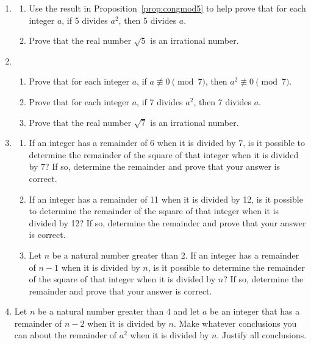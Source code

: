 \begin{enumerate}
\item 
\label{exer:sqrt5-irrational}%
\begin{enumerate}
\item Use the result in Proposition~\ref{prop:congmod5} to help prove that for each integer $a$, if 5 divides $a^2$, then 5 divides $a$.

\item Prove that the real number $\sqrt{5}$ is an irrational number.
\end{enumerate}


\item \begin{enumerate}
\item Prove that for each integer $a$, if $a \not \equiv 0 \pmod 7$, then 
$a^2 \not \equiv 0 \pmod 7$.

\item Prove that for each integer $a$, if 7 divides $a^2$, then 7 divides $a$.

\item Prove that the real number $\sqrt{7}$ is an irrational number.
\end{enumerate}

\item \label{exer:remainderbycong} \begin{enumerate}
\item If an integer has a remainder of 6 when it is divided by 7, is it possible to determine the remainder of the square of that integer when it is divided by 7?  If so, determine the remainder and prove that your answer is correct.

\item If an integer has a remainder of 11 when it is divided by 12, is it possible to determine the remainder of the square of that integer when it is divided by 12?  If so, determine the remainder and prove that your answer is correct.

\item Let $n$ be a natural number greater than 2.  If an integer has a remainder of $n - 1$ when it is divided by $n$, is it possible to determine the remainder of the square of that integer when it is divided by $n$?  If so, determine the remainder and prove that your answer is correct.
\end{enumerate}


\item Let $n$ be a natural number greater than 4 and let $a$ be an integer that has a remainder of $n - 2$ when it is divided by $n$.  Make whatever conclusions you can about the remainder of $a^2$ when it is divided by $n$.  Justify all conclusions.



\end{enumerate}
